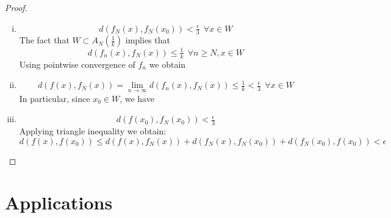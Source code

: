 \documentclass[12pt]{article}
\begin{document}
\begin{proof}
\begin{enumerate}[i.]
	\item \[ d(f_N(x), f_N(x_0))<\tfrac{\epsilon}{3} \ \ \forall x \in W\] 
	The fact that $W \subset A_N(\frac{1}{k})$ implies that 
	 \[ d(f_n(x),f_N(x))\leq \tfrac{1}{k} \ \ \forall n\geq N, x\in W\]
	Using pointwise convergence of $f_n$ we obtain
	\item \[ d(f(x),f_N(x))=\lim_{n\rightarrow \infty} d(f_n(x),f_N(x))\leq \tfrac{1}{k}<\tfrac{\epsilon}{3} \ \ \forall x\in W\]
	In particular, since $x_0\in W$, we have
	\item \[d(f(x_0),f_N(x_0))<\tfrac{\epsilon}{3}\]
Applying triangle inequality we obtain:
\[ d(f(x),f(x_0))\leq d(f(x),f_N(x))+d(f_N(x),f_N(x_0))+d(f_N(x_0),f(x_0))<\epsilon
\]
\end{enumerate}
\end{proof}
\section{Applications}
\end{document}
